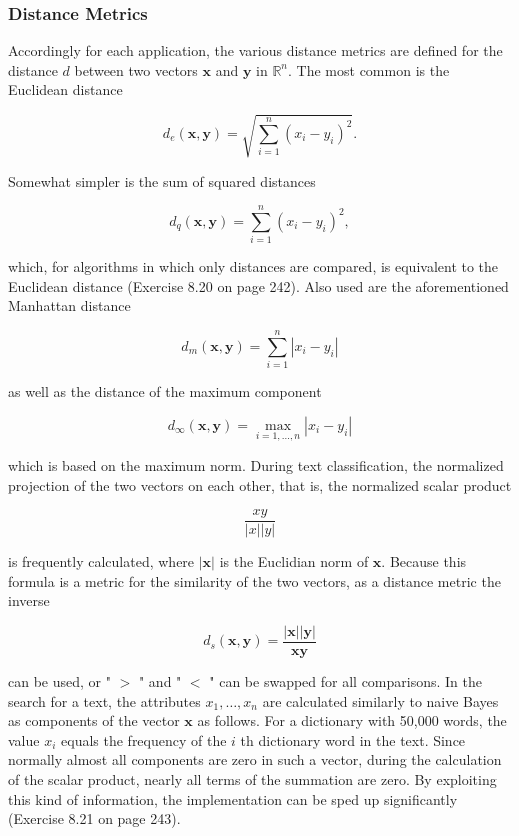 \documentclass[10pt]{article}
\begin{document}
\subsubsection*{Distance Metrics}
Accordingly for each application, the various distance metrics are defined for the distance $d$ between two vectors $\boldsymbol{x}$ and $\boldsymbol{y}$ in $\mathbb{R}^{n}$. The most common is the Euclidean distance

$$
d_{e}(\boldsymbol{x}, \boldsymbol{y})=\sqrt{\sum_{i=1}^{n}\left(x_{i}-y_{i}\right)^{2}} .
$$

Somewhat simpler is the sum of squared distances

$$
d_{q}(\boldsymbol{x}, \boldsymbol{y})=\sum_{i=1}^{n}\left(x_{i}-y_{i}\right)^{2},
$$

which, for algorithms in which only distances are compared, is equivalent to the Euclidean distance (Exercise 8.20 on page 242). Also used are the aforementioned Manhattan distance

$$
d_{m}(\boldsymbol{x}, \boldsymbol{y})=\sum_{i=1}^{n}\left|x_{i}-y_{i}\right|
$$

as well as the distance of the maximum component

$$
d_{\infty}(\boldsymbol{x}, \boldsymbol{y})=\max _{i=1, \ldots, n}\left|x_{i}-y_{i}\right|
$$

which is based on the maximum norm. During text classification, the normalized projection of the two vectors on each other, that is, the normalized scalar product

$$
\frac{x y}{|x||y|}
$$

is frequently calculated, where $|\boldsymbol{x}|$ is the Euclidian norm of $\boldsymbol{x}$. Because this formula is a metric for the similarity of the two vectors, as a distance metric the inverse

$$
d_{s}(\boldsymbol{x}, \boldsymbol{y})=\frac{|\boldsymbol{x}||\boldsymbol{y}|}{\boldsymbol{x} \boldsymbol{y}}
$$

can be used, or " $>$ " and " $<$ " can be swapped for all comparisons. In the search for a text, the attributes $x_{1}, \ldots, x_{n}$ are calculated similarly to naive Bayes as components of the vector $\boldsymbol{x}$ as follows. For a dictionary with 50,000 words, the value $x_{i}$ equals the frequency of the $i$ th dictionary word in the text. Since normally almost all components are zero in such a vector, during the calculation of the scalar product, nearly all terms of the summation are zero. By exploiting this kind of information, the implementation can be sped up significantly (Exercise 8.21 on page 243).
\end{document}
